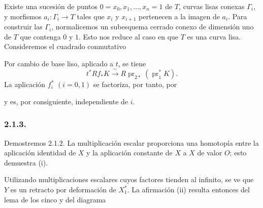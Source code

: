 Existe una sucesión de puntos $0=x_0,x_1,\ldots,x_n=1$ de $T$,
curvas lisas conexas $\Gamma_i$, y morfismos $a_i:\Gamma_i\to T$
tales que $x_i$ y $x_{i+1}$ pertenecen a la imagen de $a_i$. Para
construir las $\Gamma_i$, normalicemos un subesquema cerrado conexo de
dimensión uno de $T$ que contenga $0$ y $1$. Esto nos reduce al caso en
que $T$ es una curva lisa. Consideremos el cuadrado conmutativo
\begin{center}
\end{center}
Por cambio de base liso, aplicado a $t$, se tiene
\[
t^*Rf_*K\xrightarrow{\ \sim\ }
R\operatorname{pr}_{2*}(\operatorname{pr}_1^*K).
\]
La aplicación $f_i^*$ $(i=0,1)$ se factoriza, por tanto, por
\begin{center}
\end{center}

\pageoriginale

y es, por consiguiente, independiente de $i$.

\subsubsection*{2.1.3.}
Demostremos 2.1.2. La multiplicación escalar proporciona una homotopía
entre la aplicación identidad de $X$ y la aplicación constante de $X$ a
$X$ de valor $O$; esto demuestra (i).

Utilizando multiplicaciones escalares cuyos factores tienden al
infinito, se ve que $Y$ es un retracto por deformación de $X_1^*$. La
afirmación (ii) resulta entonces del lema de los cinco y del diagrama
\begin{center}
\end{center}

